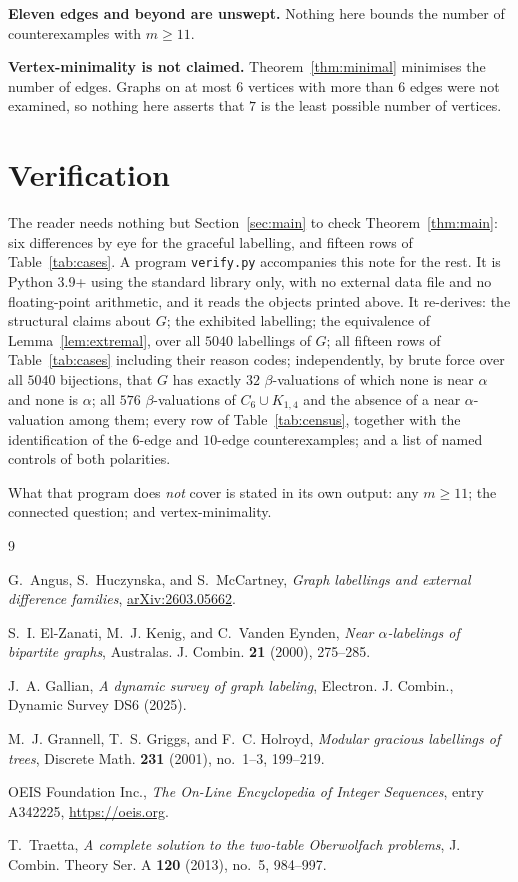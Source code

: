 \documentclass[11pt]{amsart}
\theoremstyle{remark}
\begin{document}
\medskip\noindent\textbf{Eleven edges and beyond are unswept.} Nothing here
bounds the number of counterexamples with $m\ge11$.

\medskip\noindent\textbf{Vertex-minimality is not claimed.} Theorem~\ref{thm:minimal}
minimises the number of edges. Graphs on at most $6$ vertices with more than $6$
edges were not examined, so nothing here asserts that $7$ is the least possible
number of vertices.

\section{Verification}\label{sec:verif}

The reader needs nothing but Section~\ref{sec:main} to check
Theorem~\ref{thm:main}: six differences by eye for the graceful labelling, and
fifteen rows of Table~\ref{tab:cases}. A program \texttt{verify.py} accompanies
this note for the rest. It is Python 3.9+ using the standard library only, with
no external data file and no floating-point arithmetic, and it reads the objects
printed above. It re-derives: the structural claims about $G$; the exhibited
labelling; the equivalence of Lemma~\ref{lem:extremal}, over all $5040$
labellings of $G$; all fifteen rows of Table~\ref{tab:cases} including their
reason codes; independently, by brute force over all $5040$ bijections, that $G$
has exactly $32$ $\beta$-valuations of which none is near $\alpha$ and none is
$\alpha$; all $576$ $\beta$-valuations of $C_6\cup K_{1,4}$ and the absence of a
near $\alpha$-valuation among them; every row of Table~\ref{tab:census},
together with the identification of the $6$-edge and $10$-edge
counterexamples; and a list of named controls of both polarities.

What that program does \emph{not} cover is stated in its own output: any
$m\ge11$; the connected question; and vertex-minimality.

\begin{thebibliography}{9}

G.~Angus, S.~Huczynska, and S.~McCartney,
\emph{Graph labellings and external difference families},
\href{https://arxiv.org/abs/2603.05662}{arXiv:2603.05662}.

S.~I. El-Zanati, M.~J. Kenig, and C.~Vanden Eynden,
\emph{Near $\alpha$-labelings of bipartite graphs},
Australas. J. Combin. \textbf{21} (2000), 275--285.

J.~A. Gallian,
\emph{A dynamic survey of graph labeling},
Electron. J. Combin., Dynamic Survey DS6 (2025).

M.~J. Grannell, T.~S. Griggs, and F.~C. Holroyd,
\emph{Modular gracious labellings of trees},
Discrete Math. \textbf{231} (2001), no.~1--3, 199--219.

OEIS Foundation Inc.,
\emph{The On-Line Encyclopedia of Integer Sequences},
entry A342225,
\href{https://oeis.org}{https://oeis.org}.

T.~Traetta,
\emph{A complete solution to the two-table Oberwolfach problems},
J. Combin. Theory Ser. A \textbf{120} (2013), no.~5, 984--997.

\end{thebibliography}
\end{document}
